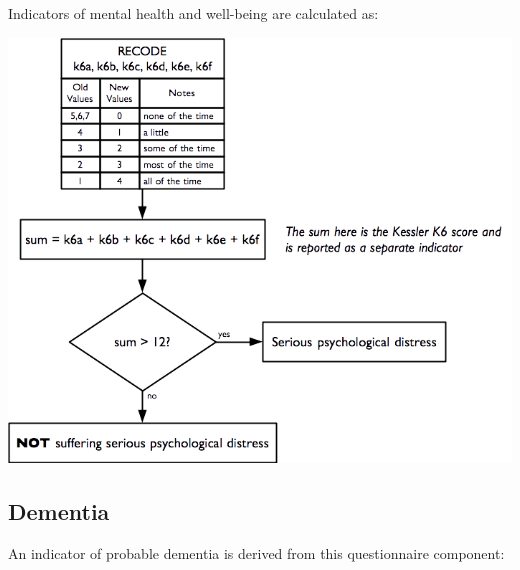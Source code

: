 \documentclass[12pt,a4paper]{book}
\theoremstyle{definition}
\theoremstyle{definition}
\theoremstyle{definition}
\theoremstyle{remark}
\begin{document}
Indicators of mental health and well-being are calculated as:

\begin{center}\includegraphics{figures/indicators19} \end{center}

\newpage

\hypertarget{dementia}{%
\subsection{Dementia}\label{dementia}}

An indicator of probable dementia is derived from this questionnaire
component:
\end{document}
